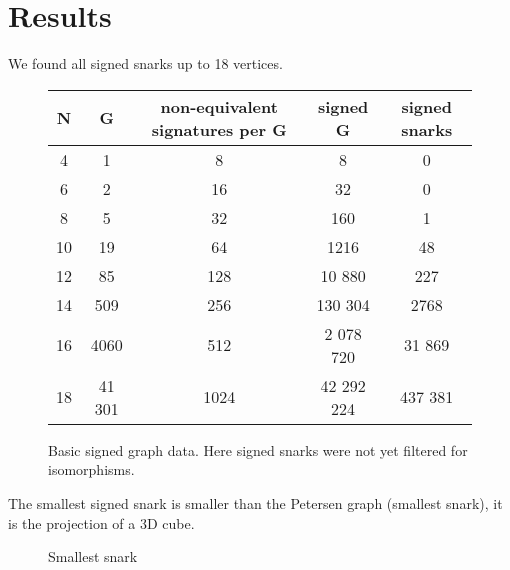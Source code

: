 \chapter{Results}

We found all signed snarks up to 18 vertices.

\begin{figure}[h]
    \centering
    \begin{tabular}{ |c|c|c|c|c| }
        \hline
        N & G & non-equivalent signatures per G & signed G & signed snarks \\
        \hline
        \hline
        4 & 1 & 8 & 8 & 0 \\
        \hline
        6 & 2 & 16 & 32 & 0 \\
        \hline
        8 & 5 & 32 & 160 & 1 \\
        \hline
        10 & 19 & 64 & 1216 & 48 \\
        \hline
        12 & 85 & 128 & 10 880 & 227 \\
        \hline
        14 & 509 & 256 & 130 304 & 2768 \\
        \hline
        16 & 4060 & 512 & 2 078 720 & 31 869 \\
        \hline
        18 & 41 301 & 1024 & 42 292 224 & 437 381 \\
        \hline
    \end{tabular}
    \caption[Basic signed graph data]{Basic signed graph data. Here signed snarks were not yet filtered for isomorphisms.}
\end{figure}

The smallest signed snark is smaller than the Petersen graph (smallest snark), it is the projection of a 3D cube.

\begin{figure}[h]
    \centering
    \caption{Smallest snark}
\end{figure}

